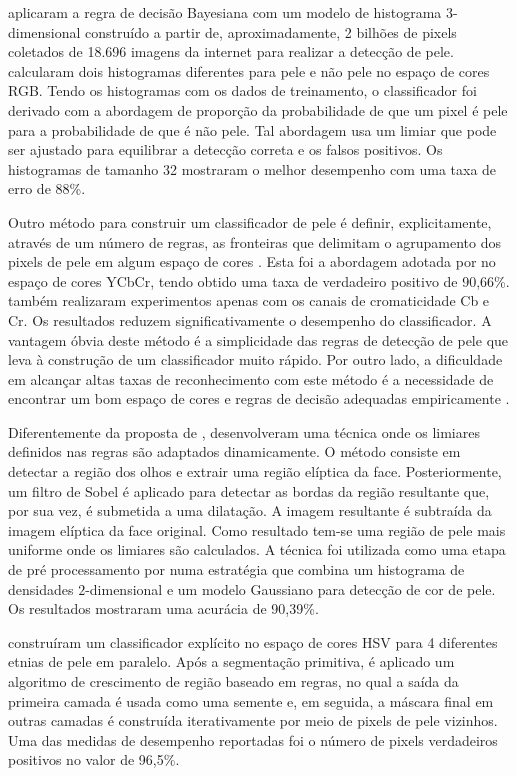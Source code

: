 \citet{jones:02} aplicaram a regra de decisão Bayesiana com um modelo de histograma $3$-dimensional construído a partir de, aproximadamente, 2 bilhões de pixels coletados de 18.696 imagens da internet para realizar a detecção de pele. \citet{jones:02} calcularam dois histogramas diferentes para pele e não pele no espaço de cores RGB. Tendo os histogramas com os dados de treinamento, o classificador foi derivado com a abordagem de proporção da probabilidade de que um pixel é pele para a probabilidade de que é não pele. Tal abordagem usa um limiar que pode ser ajustado para equilibrar a detecção correta e os falsos positivos. Os histogramas de tamanho 32 mostraram o melhor desempenho com uma taxa de erro de 88\%.

Outro método para construir um classificador de pele é definir, explicitamente, através de um número de regras, as fronteiras que delimitam o agrupamento dos pixels de pele em algum espaço de cores \citep{vezhnevets:03}. Esta foi a abordagem adotada por \citet{kovac:03} no espaço de cores YCbCr, tendo obtido uma taxa de verdadeiro positivo de 90,66\%. \citet{kovac:03} também realizaram experimentos apenas com os canais de cromaticidade Cb e Cr. Os resultados reduzem significativamente o desempenho do classificador. A vantagem óbvia deste método é a simplicidade das regras de detecção de pele que leva à construção de um classificador muito rápido. Por outro lado, a dificuldade em alcançar altas taxas de reconhecimento com este método é a necessidade de encontrar um bom espaço de cores e regras de decisão adequadas empiricamente \citep{vezhnevets:03}.

Diferentemente da proposta de \citet{kovac:03}, \citet{yogarajah:11} desenvolveram uma técnica onde os limiares definidos nas regras são adaptados dinamicamente. O método consiste em detectar a região dos olhos e extrair uma região elíptica da face. Posteriormente, um filtro de Sobel é aplicado para detectar as bordas da região resultante que, por sua vez, é submetida a uma dilatação. A imagem resultante é subtraída da imagem elíptica da face original. Como resultado tem-se uma região de pele mais uniforme onde os limiares são calculados. A técnica foi utilizada como uma etapa de pré processamento por \citet{tan:12} numa estratégia que combina um histograma de densidades $2$-dimensional e um modelo Gaussiano para detecção de cor de pele. Os resultados mostraram uma acurácia de 90,39\%.

\citet{naji:12} construíram um classificador explícito no espaço de cores HSV para 4 diferentes etnias de pele em paralelo. Após a segmentação primitiva, é aplicado um algoritmo de crescimento de região baseado em regras, no qual a saída da primeira camada é usada como uma semente e, em seguida, a máscara final em outras camadas é construída iterativamente por meio de pixels de pele vizinhos. Uma das medidas de desempenho reportadas foi o número de pixels verdadeiros positivos no valor de 96,5\%.

